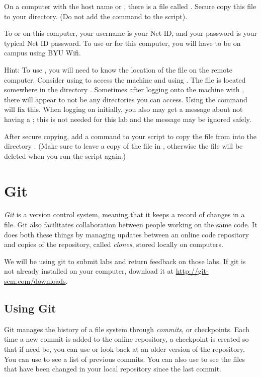 \begin{problem}
On a computer with the host name  or , there is a file called .
Secure copy this file to your  directory.
(Do not add the  command to the script).

To  or  on this computer, your username is your Net ID, and your password is your typical Net ID password.
To use  or  for this computer, you will have to be on campus using BYU Wifi.

Hint: To use , you will need to know the location of the file on the remote computer.
Consider using  to access the machine and using .
The file is located somewhere in the directory .
Sometimes after logging onto the machine with , there will appear to not be any directories you can access.
Using the command  will fix this.
When logging on initially, you also may get a message about not having a ; this is not needed for this lab and the message may be ignored safely.

After secure copying, add a command to your script to copy the file from  into the directory .
(Make sure to leave a copy of the file in , otherwise the file will be deleted when you run the script again.)
\label{problem:ssh}
\end{problem}


\section*{Git} %
\emph{Git} is a version control system, meaning that it keeps a record of changes in a file.
Git also facilitates collaboration between people working on the same code.
It does both these things by managing updates between an online code repository and copies of the repository, called \emph{clones}, stored locally on computers.

We will be using git to submit labs and return feedback on those labs. If git is not already installed on your computer, download it at \url{http://git-scm.com/downloads}.

\subsection*{Using Git} %
Git manages the history of a file system through \emph{commits}, or checkpoints.
Each time a new commit is added to the online repository, a checkpoint is created so that if need be, you can use or look back at an older version of the repository.
You can use  to see a list of previous commits.
You can also use  to see the files that have been changed in your local repository since the last commit.

